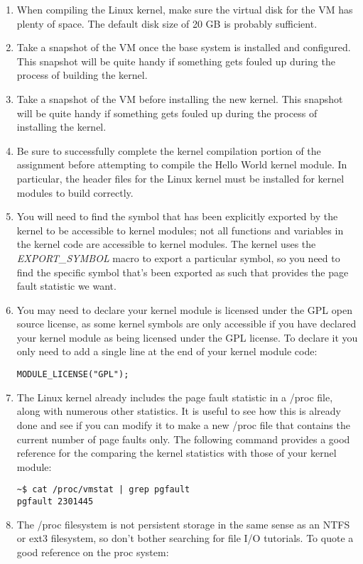 \documentclass[11pt]{article}
\begin{document}
\begin{enumerate}
\item When compiling the Linux kernel, make sure the virtual disk for the VM has plenty of space. The default disk size of 20 GB is probably sufficient.
\item Take a snapshot of the VM once the base system is installed and configured. This snapshot will be quite handy if something gets fouled up during the process of building the kernel.
\item Take a snapshot of the VM before installing the new kernel. This snapshot will be quite handy if something gets fouled up during the process of installing the kernel.
\item Be sure to successfully complete the kernel compilation portion of the assignment before attempting to compile the Hello World kernel module. In particular, the header files for the Linux kernel must be installed for kernel modules to build correctly.
\item You will need to find the symbol that has been explicitly exported by the kernel to be accessible to kernel modules; not all functions and variables in the kernel code are accessible to kernel modules. The kernel uses the \emph{EXPORT\_SYMBOL} macro to export a particular symbol, so you need to find the specific symbol that's been exported as such that provides the page fault statistic we want.
\item You may need to declare your kernel module is licensed under the GPL open source license, as some kernel symbols are only accessible if you have declared your kernel module as being licensed under the GPL license. To declare it you only need to add a single line at the end of your kernel module code\cite{gpl}:

\begin{verbatim}
MODULE_LICENSE("GPL");
\end{verbatim}
\item The Linux kernel already includes the page fault statistic in a /proc file, along with numerous other statistics. It is useful to see how this is already done and see if you can modify it to make a new /proc file that contains the current number of page faults only. The following command provides a good reference for the comparing the kernel statistics with those of your kernel module:

\begin{verbatim}
~$ cat /proc/vmstat | grep pgfault
pgfault 2301445
\end{verbatim}
\item The /proc filesystem is not persistent storage in the same sense as an NTFS or ext3 filesystem, so don't bother searching for file I/O tutorials. To quote a good reference on the proc system\cite{proc}: 



\end{enumerate}
\end{document}

